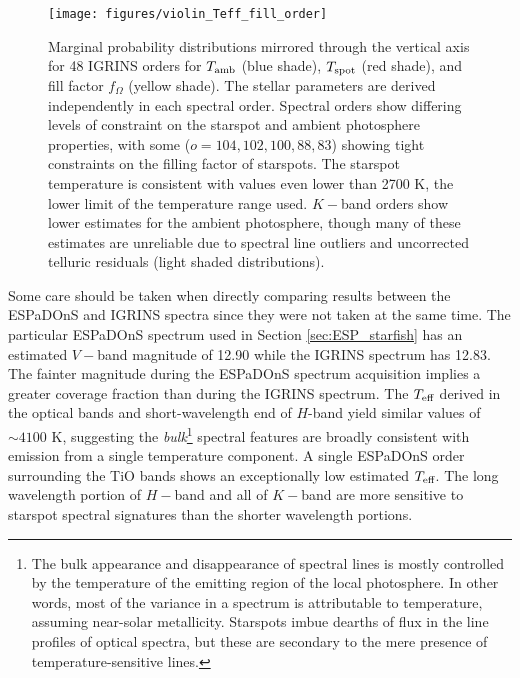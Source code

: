 \documentclass[twocolumn]{emulateapj}%
\begin{document}
\begin{figure*}
 \centering
 \texttt{[image: figures/violin\_Teff\_fill\_order]} 
 \caption{Marginal probability distributions mirrored through the vertical axis \citep[``Violin plot'']{waskom14} for 48 IGRINS orders for $T_\textrm{amb}$ (blue shade), $T_\textrm{spot}$ (red shade), and fill factor $f_{\Omega}$ (yellow shade).  The stellar parameters are derived independently in each spectral order.  Spectral orders show differing levels of constraint on the starspot and ambient photosphere properties, with some ($o=104, 102, 100, 88, 83$) showing tight constraints on the filling factor of starspots.  The starspot temperature is consistent with values even lower than 2700 K, the lower limit of the temperature range used.  $K-$band orders show lower estimates for the ambient photosphere, though many of these estimates are unreliable due to spectral line outliers and uncorrected telluric residuals (light shaded distributions).}
 \label{fig:TwoTempResults}
\end{figure*}


Some care should be taken when directly comparing results between the ESPaDOnS and IGRINS spectra since they were not taken at the same time.  The particular ESPaDOnS spectrum used in Section \ref{sec:ESP_starfish} has an estimated $V-$band magnitude of 12.90 while the IGRINS spectrum has 12.83.  The fainter magnitude during the ESPaDOnS spectrum acquisition implies a greater coverage fraction than during the IGRINS spectrum.  The $T_\textrm{eff}$ derived in the optical bands and short-wavelength end of $H$-band yield similar values of $\sim 4100$ K, suggesting the \emph{bulk}\footnote{The bulk appearance and disappearance of spectral lines is mostly controlled by the temperature of the emitting region of the local photosphere.  In other words, most of the variance in a spectrum is attributable to temperature, assuming near-solar metallicity.  Starspots imbue dearths of flux in the line profiles of optical spectra, but these are secondary to the mere presence of temperature-sensitive lines.} spectral features are broadly consistent with emission from a single temperature component. A single ESPaDOnS order surrounding the TiO bands shows an exceptionally low estimated $T_\textrm{eff}$.  The long wavelength portion of $H-$band and all of $K-$band are more sensitive to starspot spectral signatures than the shorter wavelength portions.
\end{document}
